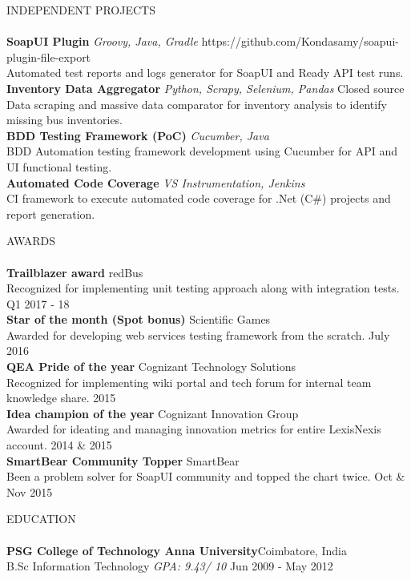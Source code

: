 \documentclass[a4paper]{article}
\newcommand{\lineunder} {
    \vspace*{-8pt} \\
    \hspace*{-18pt} \hrulefill \\
}
\newcommand{\header} [1] {
    {\hspace*{-18pt}\vspace*{6pt} \textsc{#1}}
    \vspace*{-6pt} \lineunder
}
\begin{document}
\header{INDEPENDENT PROJECTS}
{\textbf{SoapUI Plugin}} {\sl Groovy, Java, Gradle} \hfill https://github.com/Kondasamy/soapui-plugin-file-export\\
Automated test reports and logs generator for SoapUI and Ready API test runs.\\
\vspace*{2mm}
{\textbf{Inventory Data Aggregator}} {\sl Python, Scrapy, Selenium, Pandas} \hfill Closed source\\
Data scraping and massive data comparator for inventory analysis to identify missing bus inventories.\\
\vspace*{2mm}
{\textbf{BDD Testing Framework (PoC)}} {\sl Cucumber, Java} \\
BDD Automation testing framework development using Cucumber for API and UI functional testing.\\
\vspace*{2mm}
{\textbf{Automated Code Coverage}} {\sl VS Instrumentation, Jenkins} \\
CI framework to execute automated code coverage for .Net (C\#) projects and report generation.\\
\vspace*{2mm}

\header{AWARDS}
\textbf{Trailblazer award} \hfill redBus\\
Recognized for implementing unit testing approach along with integration tests. \hfill Q1 2017 - 18\\
\vspace*{2mm}
\textbf{Star of the month (Spot bonus)} \hfill Scientific Games\\
Awarded for developing web services testing framework from the scratch. \hfill July 2016\\
\vspace*{2mm}
\textbf{QEA Pride of the year} \hfill Cognizant Technology Solutions\\
Recognized for implementing wiki portal and tech forum for internal team knowledge share. \hfill 2015\\
\vspace*{2mm}
\textbf{Idea champion of the year} \hfill Cognizant Innovation Group\\
Awarded for ideating and managing innovation metrics for entire LexisNexis account. \hfill 2014 \& 2015\\
\vspace*{2mm}
\textbf{SmartBear Community Topper} \hfill SmartBear\\
Been a problem solver for SoapUI community and topped the chart twice. \hfill Oct \& Nov 2015\\
\vspace*{2mm}

\header{EDUCATION}
\textbf{PSG College of Technology \textbar{} Anna University}\hfill Coimbatore, India\\
B.Sc Information Technology \textit{GPA: 9.43/ 10} \hfill Jun 2009 - May 2012\\
\vspace{2mm}

\ 
\end{document}
